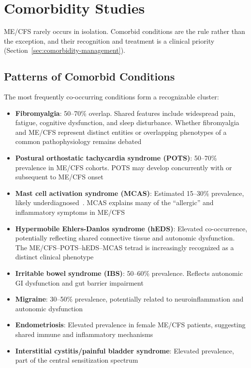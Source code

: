 \section{Comorbidity Studies}
\label{sec:comorbidity-studies}

ME/CFS rarely occurs in isolation. Comorbid conditions are the rule rather than the exception, and their recognition and treatment is a clinical priority (Section~\ref{sec:comorbidity-management}).

\subsection{Patterns of Comorbid Conditions}

The most frequently co-occurring conditions form a recognizable cluster:

\begin{itemize}
    \item \textbf{Fibromyalgia}: 50--70\% overlap. Shared features include widespread pain, fatigue, cognitive dysfunction, and sleep disturbance. Whether fibromyalgia and ME/CFS represent distinct entities or overlapping phenotypes of a common pathophysiology remains debated
    \item \textbf{Postural orthostatic tachycardia syndrome (POTS)}: 50--70\% prevalence in ME/CFS cohorts. POTS may develop concurrently with or subsequent to ME/CFS onset
    \item \textbf{Mast cell activation syndrome (MCAS)}: Estimated 15--30\% prevalence, likely underdiagnosed~\cite{Wirth2023}. MCAS explains many of the ``allergic'' and inflammatory symptoms in ME/CFS
    \item \textbf{Hypermobile Ehlers-Danlos syndrome (hEDS)}: Elevated co-occurrence, potentially reflecting shared connective tissue and autonomic dysfunction. The ME/CFS--POTS--hEDS--MCAS tetrad is increasingly recognized as a distinct clinical phenotype
    \item \textbf{Irritable bowel syndrome (IBS)}: 50--60\% prevalence. Reflects autonomic GI dysfunction and gut barrier impairment
    \item \textbf{Migraine}: 30--50\% prevalence, potentially related to neuroinflammation and autonomic dysfunction
    \item \textbf{Endometriosis}: Elevated prevalence in female ME/CFS patients, suggesting shared immune and inflammatory mechanisms
    \item \textbf{Interstitial cystitis/painful bladder syndrome}: Elevated prevalence, part of the central sensitization spectrum
\end{itemize}

